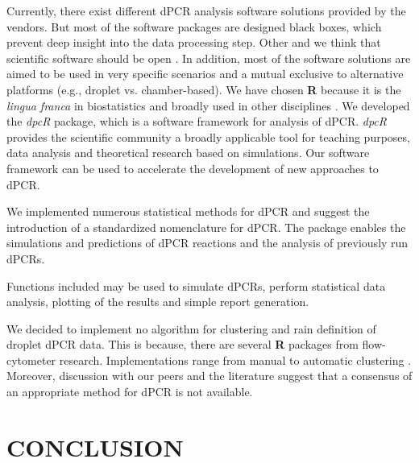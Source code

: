 \documentclass[a4,center,fleqn]{NAR}
\begin{document}
Currently, there exist different dPCR analysis software solutions provided by 
the vendors. But most of the software packages are designed black boxes, which 
prevent deep insight into the data processing step. Other and we think that 
scientific software should be open \cite{morin_shining_2012, ince_case_2012, 
rodiger_r_2015}. In addition, most of the software solutions are aimed to be 
used in very specific scenarios and a mutual exclusive to alternative platforms 
(e.g., droplet vs. chamber-based). We have chosen \textbf{R} because it is the 
\textit{lingua franca} in biostatistics and broadly used in other disciplines 
\cite{rodiger_r_2015}. We developed the \textit{dpcR} package, which is a 
software framework for analysis of dPCR. \textit{dpcR} provides the scientific 
community a broadly applicable tool for teaching purposes, data analysis and 
theoretical research based on simulations. Our software framework can be used to 
accelerate the development of new approaches to dPCR. 

We implemented numerous statistical methods for dPCR and suggest the 
introduction of a standardized nomenclature for dPCR. The package enables the 
simulations and predictions of dPCR reactions and the analysis of previously run dPCRs.

Functions included may be used to simulate dPCRs, perform statistical data 
analysis, plotting of the results and simple report generation. 



We decided to implement no algorithm for clustering and rain definition of 
droplet dPCR data. This is because, there are several \textbf{R} packages from 
flow-cytometer research. Implementations range from manual to automatic 
clustering \cite{le_meur_computational_2013, Malek15022015, trypsteen_ddpcrquant_2015}. Moreover, 
discussion with our peers and the literature suggest that a consensus of an 
appropriate method for dPCR is not available.

\section{CONCLUSION}
\end{document}
